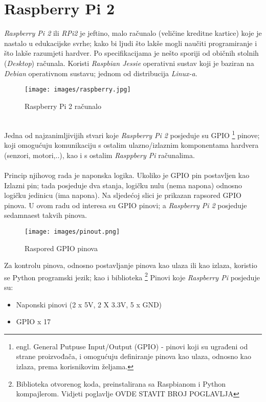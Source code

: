 \section{Raspberry Pi 2}
\textit{Raspberry Pi 2} ili \textit{RPi2} je jeftino, malo računalo (veličine kreditne kartice) koje je nastalo u edukacijske svrhe; kako bi ljudi što lakše mogli naučiti programiranje i što lakše razumjeti hardver. Po specifikacijama je nešto sporiji od običnih stolnih (\textit{Desktop}) računala. Koristi \textit{Raspbian Jessie} operativni sustav koji je baziran na \textit{Debian} operativnom sustavu; jednom od distribucija \textit{Linux-a}.\\

\begin{figure}[h]
    \centering
    \texttt{[image: images/raspberry.jpg]}
    \caption{Raspberry Pi 2 računalo}
    \label{fig:mesh1}
\end{figure}
\\
Jedna od najzanimljivijih stvari koje \textit{Raspberry Pi 2} posjeduje su GPIO \footnote{engl. General Putpuse Input/Output (GPIO) - pinovi koji su ugrađeni od strane proizvođača, i omogućuju definiranje pinova kao ulaza, odnosno kao izlaza, prema korisnikovim željama.
} pinove; koji omogućuju komunikaciju s ostalim ulazno/izlaznim komponentama hardvera (senzori, motori,..), kao i s ostalim \textit{Rasppbery Pi} računalima.\\
\\
Princip njihovog rada je naponska logika. Ukoliko je GPIO pin postavljen kao Izlazni pin; tada posjeduje dva stanja, logičku nulu (nema napona) odnosno logičku jedinicu (ima napona). Na sljedećoj slici je prikazan rapsored GPIO pinova. U ovom radu od interesa su GPIO pinovi; a \textit{Raspberry Pi 2} posjeduje sedamnaest takvih pinova.\\

\begin{figure}[h]
    \centering
    \texttt{[image: images/pinout.png]}
    \caption{Raspored GPIO pinova}
    \label{fig:mesh1}
\end{figure}
Za kontrolu pinova, odnosno postavljanje pinova kao ulaza ili kao izlaza, koristio se Python programski jezik; kao i biblioteka  \footnote{Biblioteka otvorenog koda, preinstalirana sa Raspbianom i Python kompajlerom. Vidjeti poglavlje OVDE STAVIT BROJ POGLAVLJA}
\newpage
Pinovi koje \textit{Raspberry Pi} posjeduje su:
\begin{itemize}
    \item Naponski pinovi (2 x 5V, 2 X 3.3V, 5 x GND)
    \item GPIO x 17\\
\end{itemize}

